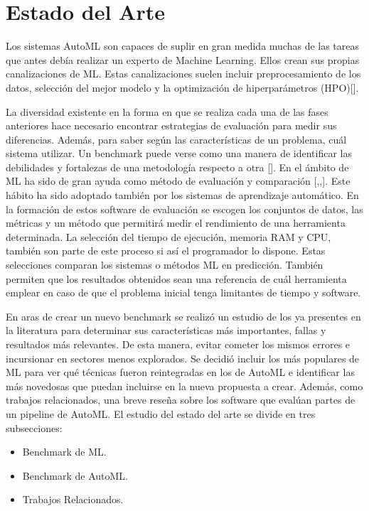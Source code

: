 \chapter{Estado del Arte}\label{chapter:state-of-the-art}

Los sistemas AutoML son capaces de suplir en gran medida muchas de las tareas que antes debía realizar un experto de Machine Learning. Ellos crean sus
propias canalizaciones de ML. Estas canalizaciones suelen incluir preprocesamiento de los datos, selección del mejor modelo y la optimización de hiperparámetros 
(HPO)[\cite{36}].

La diversidad existente en la forma en que se realiza cada una de las fases anteriores hace necesario encontrar estrategias de evaluación para medir 
sus diferencias. Además, para saber según las características de un problema, cuál sistema utilizar. Un benchmark puede verse como una manera de identificar las 
debilidades y fortalezas de una metodología respecto a otra [\cite{2}]. En el ámbito de ML ha sido de gran ayuda como método de evaluación y comparación 
[\cite{5},\cite{6},\cite{46}]. Este hábito ha sido adoptado también por los sistemas de aprendizaje automático. En la formación de estos software de evaluación 
se escogen los conjuntos de datos, las métricas y un método que permitirá medir el rendimiento de una herramienta determinada. La selección del tiempo de ejecución, 
memoria RAM y CPU, también son parte de este proceso si así el programador lo dispone. Estas selecciones comparan los sistemas o métodos ML en predicción. También 
permiten que los resultados obtenidos sean una referencia de cuál herramienta emplear en caso de que el problema inicial tenga limitantes de tiempo y software.

En aras de crear un nuevo benchmark se realizó un estudio de los ya presentes en la literatura para determinar sus características más importantes, 
fallas y resultados más relevantes. De esta manera, evitar cometer los mismos errores e incursionar en sectores menos explorados. Se decidió incluir los más 
populares de ML para ver qué técnicas fueron reintegradas en los de AutoML e identificar las más novedosas que puedan incluirse en la nueva propuesta a crear. Además, 
como trabajos relacionados, una breve reseña sobre los software que evalúan partes de un pipeline de AutoML. El estudio del estado del arte se divide en tres 
subsecciones:
\begin{itemize}
\item Benchmark de ML. 
\item Benchmark de AutoML.
\item Trabajos Relacionados.
\end{itemize}
